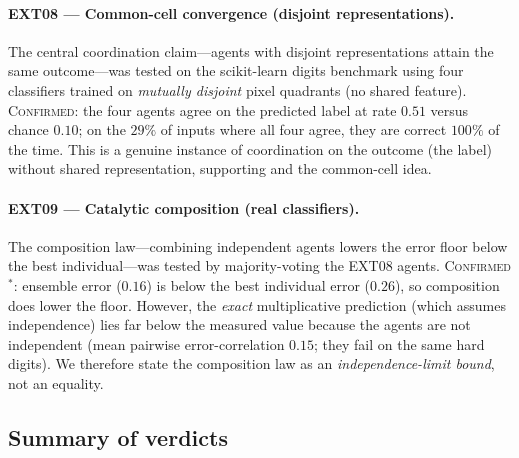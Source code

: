 \documentclass[11pt,twocolumn,a4paper]{article}
\begin{document}
\paragraph{EXT08 --- Common-cell convergence (disjoint representations).}
The central coordination claim---agents with disjoint representations attain the
same outcome---was tested on the scikit-learn digits benchmark
\cite{pedregosa2011} using four classifiers trained on \emph{mutually disjoint}
pixel quadrants (no shared feature). \textsc{Confirmed}: the four agents agree
on the predicted label at rate $0.51$ versus chance $0.10$; on the $29\%$ of
inputs where all four agree, they are correct $100\%$ of the time. This is a
genuine instance of coordination on the outcome (the label) without shared
representation, supporting  and the common-cell idea.

\paragraph{EXT09 --- Catalytic composition (real classifiers).}
The composition law---combining independent agents lowers the error floor below
the best individual---was tested by majority-voting the EXT08 agents.
\textsc{Confirmed$^\ast$}: ensemble error ($0.16$) is below the best individual
error ($0.26$), so composition does lower the floor. However, the \emph{exact}
multiplicative prediction (which assumes independence) lies far below the
measured value because the agents are not independent (mean pairwise
error-correlation $0.15$; they fail on the same hard digits). We therefore
state the composition law as an \emph{independence-limit bound}, not an
equality.

\subsection{Summary of verdicts}
\end{document}
